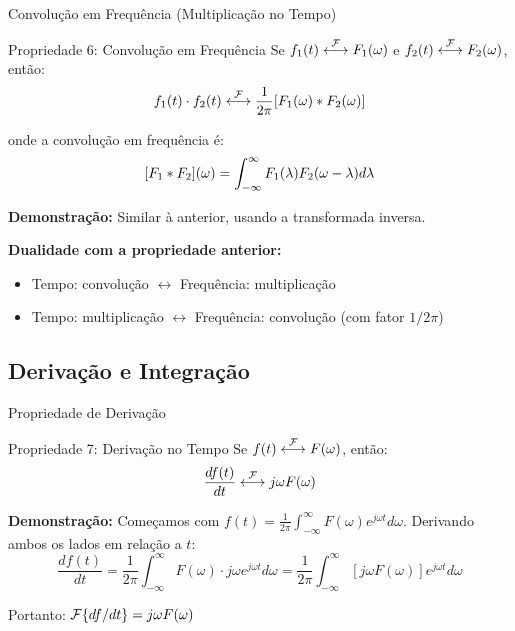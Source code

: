 \begin{frame}{Convolução em Frequência (Multiplicação no Tempo)}

\begin{block}{Propriedade 6: Convolução em Frequência}
Se $f_1(t) \mathrel{\overset{\mathcal{F}}{\longleftrightarrow}} F_1(\omega)$ e $f_2(t) \mathrel{\overset{\mathcal{F}}{\longleftrightarrow}} F_2(\omega)$, então:
\vspace{-2mm}
\[
f_1(t) \cdot f_2(t) \mathrel{\overset{\mathcal{F}}{\longleftrightarrow}} \frac{1}{2\pi} [F_1(\omega) \ast F_2(\omega)]
\]
\vspace{-4mm}
\end{block}

onde a convolução em frequência é:
\vspace{-2mm}
\[
[F_1 \ast F_2](\omega) = \int_{-\infty}^{\infty} F_1(\lambda) F_2(\omega - \lambda) d\lambda
\]
\vspace{-4mm}

\textbf{Demonstração:} Similar à anterior, usando a transformada inversa.

\textbf{Dualidade com a propriedade anterior:}
\begin{itemize}\itemsep0pt
\item Tempo: convolução $\leftrightarrow$ Frequência: multiplicação
\item Tempo: multiplicação $\leftrightarrow$ Frequência: convolução (com fator $1/2\pi$)
\end{itemize}

\end{frame}


\subsection{Derivação e Integração}

\begin{frame}{Propriedade de Derivação}

\begin{block}{Propriedade 7: Derivação no Tempo}
Se $f(t) \mathrel{\overset{\mathcal{F}}{\longleftrightarrow}} F(\omega)$, então:
\vspace{-2mm}
\[
\frac{df(t)}{dt} \mathrel{\overset{\mathcal{F}}{\longleftrightarrow}} j\omega F(\omega)
\]
\vspace{-4mm}
\end{block}

\textbf{Demonstração:} Começamos com
$f(t) = \frac{1}{2\pi} \int_{-\infty}^{\infty} F(\omega) e^{j\omega t} d\omega$.
Derivando ambos os lados em relação a $t$:
\vspace{-2mm}
\[
\frac{df(t)}{dt} = \frac{1}{2\pi} \int_{-\infty}^{\infty} F(\omega) \cdot j\omega e^{j\omega t} d\omega
= \frac{1}{2\pi} \int_{-\infty}^{\infty} [j\omega F(\omega)] e^{j\omega t} d\omega
\]
\vspace{-4mm}

Portanto: $\mathcal{F}\{df/dt\} = j\omega F(\omega)$

\end{frame}


